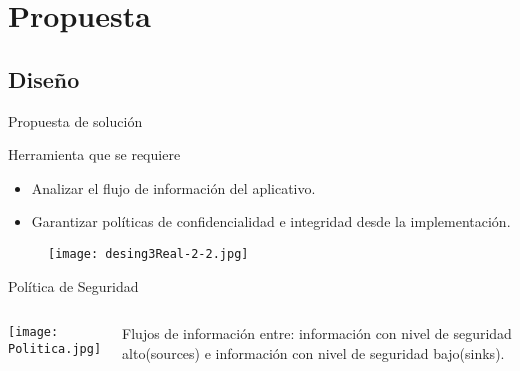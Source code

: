 \section{Propuesta}
 
\subsection{Diseño}
\begin{frame}{Propuesta de solución}
\begin{block}{Herramienta que se requiere}
		\begin{itemize}
		  \item Analizar el flujo de información del aplicativo.
		  \item Garantizar políticas de confidencialidad e integridad desde la
		  implementación.
		\end{itemize}
	\end{block}
	\begin{figure}[t!]
		\begin{center} 
		\texttt{[image: desing3Real-2-2.jpg]} 
		\end{center}
	\end{figure}
\end{frame}
\begin{frame}{Política de Seguridad}
	\begin{columns}[c]
	\column{1.5in}
	\begin{center}
	\texttt{[image: Politica.jpg]} 
	\end{center}
	\column{1.5in}
	Flujos de información entre: información con nivel de seguridad alto(sources) e
	información con nivel de seguridad bajo(sinks).
	\end{columns}
\end{frame}

